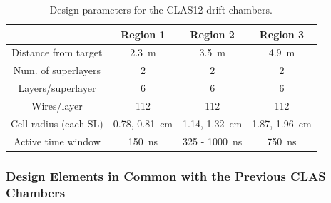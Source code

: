 \small{
\begin{table}[hbt]
\begin{center}
\begin{tabular}{||c|c|c|c||} \hline \hline
            &{\bf Region 1}&{\bf Region 2}&{\bf Region 3}\\ \hline
Distance from target & 2.3~m    & 3.5~m        & 4.9~m    \\ \hline
Num. of superlayers  & 2        & 2            & 2        \\ \hline
Layers/superlayer    & 6        & 6            & 6        \\ \hline
Wires/layer          & 112      & 112          & 112      \\ \hline
Cell radius (each SL) & 0.78, 0.81~cm  & 1.14, 1.32~cm      & 1.87, 1.96~cm  \\ \hline
Active time window   & 150~ns   & 325 - 1000~ns & 750~ns   \\ \hline
\end{tabular}
\caption{\small{Design parameters for the CLAS12 drift chambers.}}
\label{fwd-dc-design-parms}
\end{center}
\end{table}
}

\subsubsection{Design Elements in Common with the Previous CLAS Chambers}

